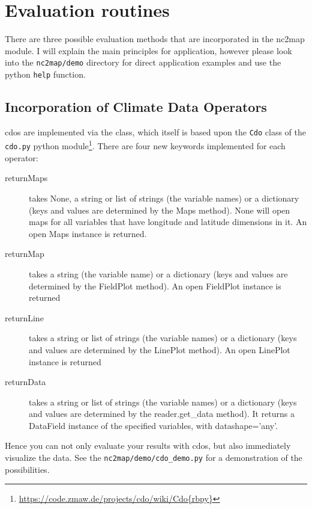\chapter{Evaluation routines} \label{ch:eval}
There are three possible evaluation methods that are incorporated in the \gls{nc2map} module. I will explain the main principles for application, however please look into the \lstinline|nc2map/demo| directory for direct application examples and use the python \lstinline|help| function.

\section{Incorporation of Climate Data Operators} \label{sec:cdo}
\glspl{cdo} are implemented via the  class, which itself is based upon the \lstinline|Cdo| class of the \lstinline|cdo.py| python module\footnote{\url{https://code.zmaw.de/projects/cdo/wiki/Cdo{rbpy}}}. There are four new keywords implemented for each operator:
\begin{description}
	\item[returnMaps] takes None, a string or list of strings (the variable
	              names) or a dictionary (keys and values are determined by the
	              \gls{Maps} method). None will open maps for all
	              variables that have longitude and latitude dimensions in it.
	              An open \gls{Maps} instance is returned.
	\item[returnMap] takes a string (the variable name) or a dictionary
	              (keys and values are determined by the
	              \gls{FieldPlot} method). An open \gls{FieldPlot}
	              instance is returned
	\item[returnLine] takes a string or list of strings (the variable
	              names) or a dictionary (keys and values are determined by the
	              \gls{LinePlot} method). An open \gls{LinePlot} instance is returned
	\item[returnData] takes a string or list of strings (the variable
	              names) or a dictionary (keys and values are determined by
	              the \gls{reader.get_data} method).
	              It returns a \gls{DataField} instance of the
	              specified variables, with datashape='any'.
\end{description}
Hence you can not only evaluate your results with cdos, but also immediately visualize the data. See the \lstinline|nc2map/demo/cdo_demo.py| for a demonstration of the possibilities.

